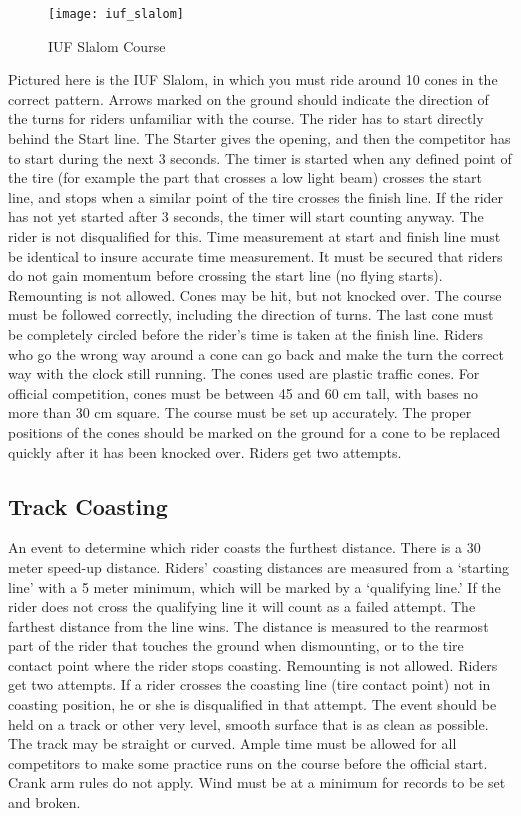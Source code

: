 \begin{figure}[h]
\begin{center}
\texttt{[image: iuf\_slalom]}
\end{center}
\vspace{-20pt}
\caption{IUF Slalom Course \label{fig:iuf_slalom}}
\vspace{-10pt}
\end{figure}
Pictured here is the IUF Slalom, in which you must ride around 10 cones in the correct pattern.
Arrows marked on the ground should indicate the direction of the turns for riders unfamiliar with the course.
The rider has to start directly behind the Start line.
The Starter gives the opening, and then the competitor has to start during the next 3 seconds.
The timer is started when any defined point of the tire (for example the part that crosses a low light beam) crosses the start line, and stops when a similar point of the tire crosses the finish line.
If the rider has not yet started after 3 seconds, the timer will start counting anyway.
The rider is not disqualified for this.
Time measurement at start and finish line must be identical to insure accurate time measurement.
It must be secured that riders do not gain momentum before crossing the start line (no flying starts).
Remounting is not allowed.
Cones may be hit, but not knocked over.
The course must be followed correctly, including the direction of turns.
The last cone must be completely circled before the rider's time is taken at the finish line.
Riders who go the wrong way around a cone can go back and make the turn the correct way with the clock still running.
The cones used are plastic traffic cones.
For official competition, cones must be between 45 and 60 cm tall, with bases no more than 30 cm square.
The course must be set up accurately.
The proper positions of the cones should be marked on the ground for a cone to be replaced quickly after it has been knocked over.
Riders get two attempts.

\subsection{Track Coasting}
An event to determine which rider coasts the furthest distance.
There is a 30 meter speed-up distance.
Riders' coasting distances are measured from a `starting line' with a 5 meter minimum, which will be marked by a `qualifying line.'
If the rider does not cross the qualifying line it will count as a failed attempt.
The farthest distance from the line wins.
The distance is measured to the rearmost part of the rider that touches the ground when dismounting, or to the tire contact point where the rider stops coasting.
Remounting is not allowed.
Riders get two attempts.
If a rider crosses the coasting line (tire contact point) not in coasting position, he or she is disqualified in that attempt.
The event should be held on a track or other very level, smooth surface that is as clean as possible. The track may be straight or curved.
Ample time must be allowed for all competitors to make some practice runs on the course before the official start.
Crank arm rules do not apply.
Wind must be at a minimum for records to be set and broken.

